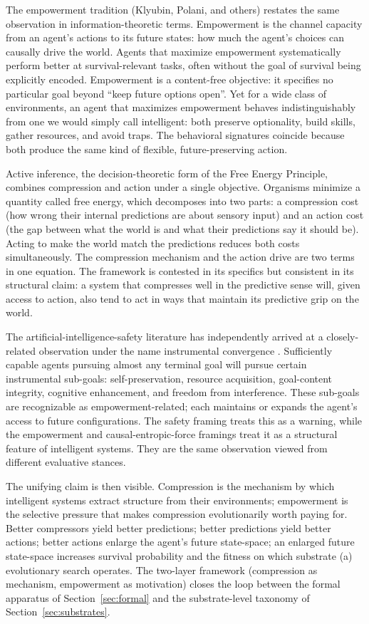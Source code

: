 \documentclass[11pt]{article}
\begin{document}
The empowerment tradition (Klyubin, Polani, and others) restates the same observation in information-theoretic terms. Empowerment is the channel capacity from an agent's actions to its future states: how much the agent's choices can causally drive the world. Agents that maximize empowerment systematically perform better at survival-relevant tasks, often without the goal of survival being explicitly encoded. Empowerment is a content-free objective: it specifies no particular goal beyond ``keep future options open''. Yet for a wide class of environments, an agent that maximizes empowerment behaves indistinguishably from one we would simply call intelligent: both preserve optionality, build skills, gather resources, and avoid traps. The behavioral signatures coincide because both produce the same kind of flexible, future-preserving action.

Active inference, the decision-theoretic form of the Free Energy Principle, combines compression and action under a single objective. Organisms minimize a quantity called free energy, which decomposes into two parts: a compression cost (how wrong their internal predictions are about sensory input) and an action cost (the gap between what the world is and what their predictions say it should be). Acting to make the world match the predictions reduces both costs simultaneously. The compression mechanism and the action drive are two terms in one equation. The framework is contested in its specifics but consistent in its structural claim: a system that compresses well in the predictive sense will, given access to action, also tend to act in ways that maintain its predictive grip on the world.

The artificial-intelligence-safety literature has independently arrived at a closely-related observation under the name instrumental convergence \citep{bostrom2014}. Sufficiently capable agents pursuing almost any terminal goal will pursue certain instrumental sub-goals: self-preservation, resource acquisition, goal-content integrity, cognitive enhancement, and freedom from interference. These sub-goals are recognizable as empowerment-related; each maintains or expands the agent's access to future configurations. The safety framing treats this as a warning, while the empowerment and causal-entropic-force framings treat it as a structural feature of intelligent systems. They are the same observation viewed from different evaluative stances.

The unifying claim is then visible. Compression is the mechanism by which intelligent systems extract structure from their environments; empowerment is the selective pressure that makes compression evolutionarily worth paying for. Better compressors yield better predictions; better predictions yield better actions; better actions enlarge the agent's future state-space; an enlarged future state-space increases survival probability and the fitness on which substrate (a) evolutionary search operates. The two-layer framework (compression as mechanism, empowerment as motivation) closes the loop between the formal apparatus of Section~\ref{sec:formal} and the substrate-level taxonomy of Section~\ref{sec:substrates}.
\end{document}
